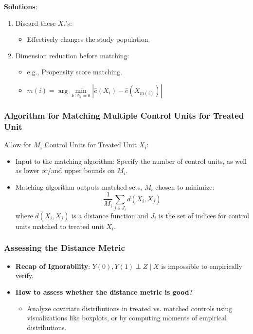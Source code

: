 \textbf{Solutions}: 

\begin{enumerate}
    \item Discard these $X_i$'s:
    \begin{itemize}
        \item Effectively changes the study population.
    \end{itemize}
    \item Dimension reduction before matching:
    \begin{itemize}
        \item e.g., Propensity score matching.
        \item $m(i) = \arg \min\limits_{k: Z_k = 0} |\hat{e}(X_i) - \hat{e}(X_{m(i)})|$
    \end{itemize}
\end{enumerate}


\subsubsection{Algorithm for Matching Multiple Control Units for Treated Unit}
Allow for $M_i$ Control Units for Treated Unit $X_i$:
\begin{itemize}
    \item Input to the matching algorithm: Specify the number of control units, as well as lower or/and upper bounds on $M_i$.

     \item Matching algorithm outputs matched sets, $M_i$ chosen to minimize:
    \[
    \frac{1}{M_i} \sum_{j \in J_i} d(X_i, X_j)
    \]
    where $d(X_i, X_j)$ is a distance function and $J_i$ is the set of indices for control units matched to treated unit $X_i$.
\end{itemize}

\subsubsection{Assessing the Distance Metric}
\begin{itemize}
    \item \textbf{Recap of Ignorability}: $Y(0), Y(1) \perp Z \mid X$ is impossible to empirically verify.
    \item \textbf{How to assess whether the distance metric is good?}
    \begin{itemize}
        \item Analyze covariate distributions in treated vs. matched controls using visualizations like boxplots, or by computing moments of empirical distributions.
    \end{itemize}
\end{itemize}

